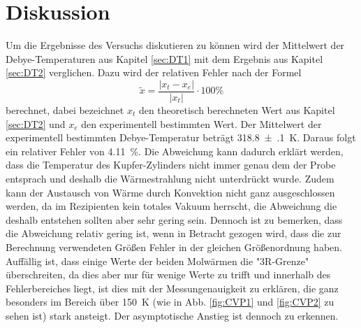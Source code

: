 \section{Diskussion}
\label{sec:Diskussion}
Um die Ergebnisse des Versuchs diskutieren zu können wird der Mittelwert der Debye-Temperaturen 
aus Kapitel \ref{sec:DT1} mit dem Ergebnis aus Kapitel \ref{sec:DT2} verglichen. 
Dazu wird der relativen Fehler nach der Formel
\begin{equation*}
  \tilde{x} = \frac{ \lvert x_{t} - x_{e} \rvert}{\lvert x_{t} \rvert}
  \cdot 100 \%
\label{eq:relf}
\end{equation*}
berechnet, dabei bezeichnet $x_{t}$ den theoretisch berechneten Wert aus Kapitel \ref{sec:DT2} und 
$x_{e}$ den experimentell bestimmten Wert. Der Mittelwert der experimentell bestimmten 
Debye-Temperatur beträgt \SI{318.8(1)}{\kelvin}.
Daraus folgt ein relativer Fehler von \SI{4.11}{\percent}. 
Die Abweichung kann dadurch erklärt 
werden, dass die Temperatur des Kupfer-Zylinders nicht immer genau dem der Probe entsprach und 
deshalb die Wärmestrahlung nicht unterdrückt wurde. Zudem kann der Austausch von Wärme durch 
Konvektion nicht ganz ausgeschlossen werden, da im Rezipienten kein totales Vakuum herrscht, 
die Abweichung die deshalb entstehen sollten aber sehr gering sein. 
Dennoch ist zu bemerken, dass die Abweichung 
relativ gering ist, wenn in Betracht gezogen wird, dass die zur Berechnung verwendeten Größen 
Fehler in der gleichen Größenordnung haben. Auffällig ist, dass einige Werte der beiden Molwärmen 
die "3R-Grenze" überschreiten, da dies aber nur für wenige Werte zu trifft und innerhalb des 
Fehlerbereiches liegt, ist dies mit der Messungenauigkeit zu erklären, die ganz besonders im 
Bereich über \SI{150}{\kelvin} (wie in Abb. \ref{fig:CVP1} und \ref{fig:CVP2} zu sehen ist) stark ansteigt. Der 
asymptotische Anstieg ist dennoch zu erkennen. 

